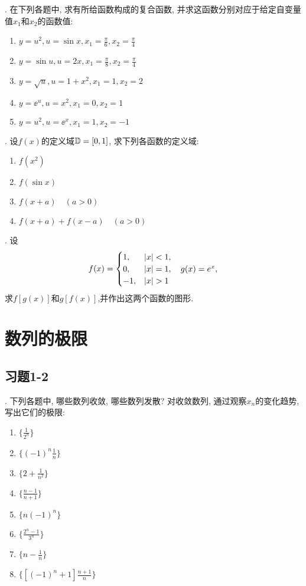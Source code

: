 \begin{task}{}
  . 在下列各题中, 求有所给函数构成的复合函数, 并求这函数分别对应于给定自变量值$x_1$和$x_2$的函数值:
  \begin{enumerate}
    \renewcommand{\labelenumi}{(\theenumi)}
  \item
    $y=u^2, u=\sin x,x_1=\frac{\pi}{6}, x_2=\frac{\pi}{4}$
  \item
    $y=\sin u, u=2x,x_1=\frac{\pi}{8}, x_2=\frac{\pi}{4}$
  \item
    $y=\sqrt{u}, u=1 + x^2, x_1=1, x_2=2$
  \item
    $y=\ee^u, u=x^2, x_1=0, x_2=1$
  \item
    $y=u^2, u=\ee^x, x_1=1, x_2=-1$
  \end{enumerate}
  . 设$f(x)$的定义域$\mathbb D = [0,1]$, 求下列各函数的定义域:
  \begin{enumerate}
    \renewcommand{\labelenumi}{(\theenumi)}
  \item
    $f(x^2)$
  \item
    $f(\sin x)$
  \item
    $f(x + a)\quad (a > 0)$
  \item
    $f(x + a) + f(x - a)\quad (a > 0)$
  \end{enumerate}
  . 设
  \begin{align*}
    f(x)=
    \begin{cases}
      1,&\abs{x}<1,\\
      0,&\abs{x}=1,\quad g(x)=e^x,\\
      -1,&\abs{x}>1
    \end{cases}
  \end{align*}
  求$f[g(x)]$和$g[f(x)]$,并作出这两个函数的图形.
\end{task}

\section{数列的极限}
\subsection{习题1-2}
\begin{task}{}
  . 下列各题中, 哪些数列收敛, 哪些数列发散? 对收敛数列, 通过观察${x_n}$的变化趋势, 写出它们的极限:
  \begin{multicols}{2}
    \begin{enumerate}
      \renewcommand{\labelenumi}{(\theenumi)}
    \item
      $\{\frac{1}{2^n}\}$
    \item
      $\{(-1)^n\frac{1}{n}\}$
    \item
      $\{2+\frac{1}{n^2}\}$
    \item
      $\{\frac{n-1}{n+1}\}$
    \item
      $\{n(-1)^n\}$
    \item
      $\{\frac{2^n-1}{3^n}\}$
    \item
      $\{n-\frac{1}{n}\}$
    \item
      $\{[(-1)^n+1]\frac{n+1}{n}\}$
    \end{enumerate}
  \end{multicols}
\end{task}


